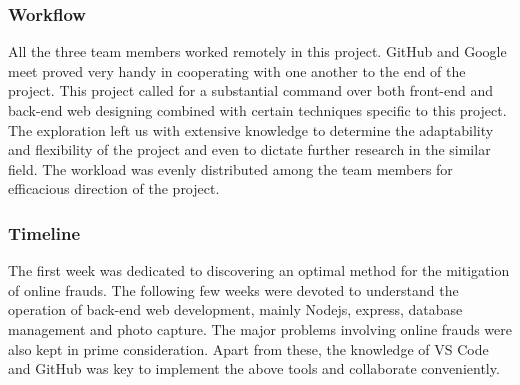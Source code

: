 \documentclass[12pt, oneside, a4paper]{article}
\begin{document}
\subsubsection{Workflow}
All the three team members worked remotely in this project. GitHub and Google meet proved very handy in cooperating with one another to the end of the project. This project called for a substantial command over both front-end and back-end web designing combined with certain techniques specific to this project. The exploration left us with extensive knowledge to determine the adaptability and flexibility of the project and even to dictate further research in the similar field. The workload was evenly distributed among the team members for efficacious direction of the project.

\subsubsection{Timeline}
The first week was dedicated to discovering an optimal method for the mitigation of online frauds. The following few weeks were devoted to understand the operation of back-end web development, mainly Nodejs, express, database management and photo capture. The major problems involving online frauds were also kept in prime consideration. Apart from these, the knowledge of VS Code and GitHub was key to implement the above tools and collaborate conveniently.
\pagebreak
\end{document}
